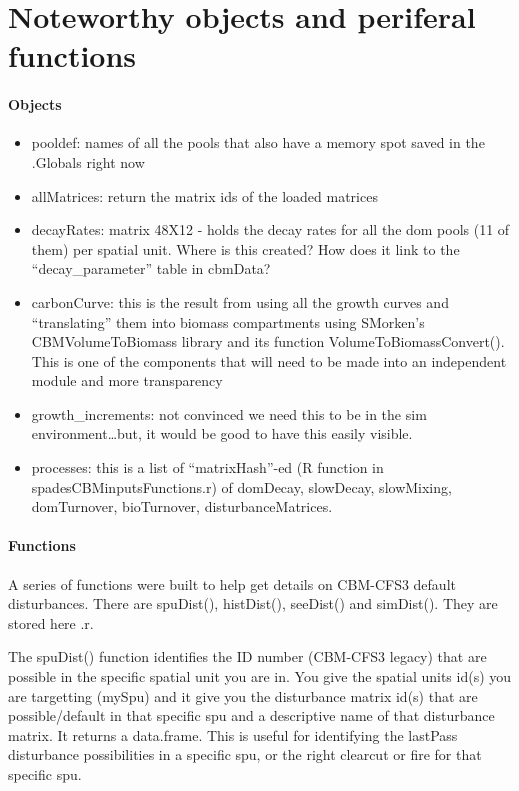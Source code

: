 \documentclass[]{article}
\providecommand{\tightlist}{%
  \setlength{\itemsep}{0pt}\setlength{\parskip}{0pt}}
\let\oldparagraph\paragraph
\renewcommand{\paragraph}[1]{\oldparagraph{#1}\mbox{}}
\begin{document}
\section{Noteworthy objects and periferal
functions}\label{noteworthy-objects-and-periferal-functions}

\paragraph{Objects}\label{objects}

\begin{itemize}
\tightlist
\item
  pooldef: names of all the pools that also have a memory spot saved in
  the .Globals right now
\item
  allMatrices: return the matrix ids of the loaded matrices
\item
  decayRates: matrix 48X12 - holds the decay rates for all the dom pools
  (11 of them) per spatial unit. Where is this created? How does it link
  to the ``decay\_parameter'' table in cbmData?
\item
  carbonCurve: this is the result from using all the growth curves and
  ``translating'' them into biomass compartments using SMorken's
  CBMVolumeToBiomass library and its function VolumeToBiomassConvert().
  This is one of the components that will need to be made into an
  independent module and more transparency
\item
  growth\_increments: not convinced we need this to be in the sim
  environment\ldots{}but, it would be good to have this easily visible.
\item
  processes: this is a list of ``matrixHash''-ed (R function in
  spadesCBMinputsFunctions.r) of domDecay, slowDecay, slowMixing,
  domTurnover, bioTurnover, disturbanceMatrices.
\end{itemize}

\paragraph{Functions}\label{functions}

A series of functions were built to help get details on CBM-CFS3 default
disturbances. There are spuDist(), histDist(), seeDist() and simDist().
They are stored here \spadesCBM\exploringCode\spadesCBMextraFunctions.r.

The spuDist() function identifies the ID number (CBM-CFS3 legacy) that
are possible in the specific spatial unit you are in. You give the
spatial units id(s) you are targetting (mySpu) and it give you the
disturbance matrix id(s) that are possible/default in that specific spu
and a descriptive name of that disturbance matrix. It returns a
data.frame. This is useful for identifying the lastPass disturbance
possibilities in a specific spu, or the right clearcut or fire for that
specific spu.
\end{document}
